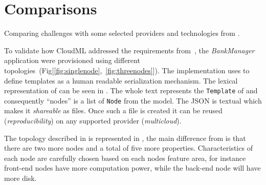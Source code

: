 

\section{Comparisons}


Comparing challenges with some selected providers and technologies from .




To validate how CloudML addressed the requirements from~,
the \emph{BankManager} application were provisioned using different topologies~(Fig[\ref{fig:singlenode},~\ref{fig:threenodes}]).
The implementation uses  to define templates as a human readable serialization mechanism.
The lexical representation of  can be seen in . 
The whole text represents the \texttt{Template} of  and consequently 
``nodes'' is a list of \texttt{Node} from the model.
The JSON is textual which makes it \emph{shareable} as files.
Once such a file is created it can be reused (\emph{reproducibility}) 
on any supported provider (\emph{multicloud}).


The topology described in  is represented in ,
the main difference from  is that there are two more nodes and a total of 
five more properties.
Characteristics of each node are carefully chosen based on each nodes feature area, for instance 
front-end nodes have more computation power, while the back-end node will have more disk.

